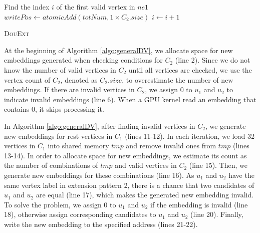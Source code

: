\begin{algorithm}
	Find the index $i$ of the first valid vertex in $ne1$\;
	$writePos \leftarrow atomicAdd(totNum,1 \times C_{2}.size)$\;
	$i \leftarrow i+1$\;
	\caption{\textsc{DouExt}}
	\label{algo:generalDV}
\end{algorithm}

At the beginning of Algorithm \ref{algo:generalDV}, we allocate space for new embeddings generated when checking conditions for $C_2$ (line 2). Since we do not know the number of valid vertices in $C_2$ until all vertices are checked, we use the vertex count of $C_2$, denoted as $C_{2}.size$, to overestimate the number of new embeddings. If there are invalid vertices in $C_2$, we assign 0 to $u_1$ and $u_2$ to indicate invalid embeddings (line 6). When a GPU kernel read an embedding that contains 0, it skips processing it.

In Algorithm \ref{algo:generalDV}, after finding invalid vertices in $C_2$, we generate new embeddings for rest vertices in $C_1$ (lines 11-12). In each iteration, we load 32 vertices in $C_1$ into shared memory $tmp$ and remove invalid ones from $tmp$ (lines 13-14). In order to allocate space for new embeddings, we estimate its count as the number of combinations of $tmp$ and valid vertices in $C_2$ (line 15). Then, we generate new embeddings for these combinations (line 16). As $u_1$ and $u_2$ have the same vertex label in extension pattern 2, there is a chance that two candidates of $u_1$ and $u_2$ are equal (line 17), which makes the generated new embedding invalid. To solve the problem, we assign 0 to $u_1$ and $u_2$ if the embedding is invalid (line 18), otherwise assign corresponding candidates to $u_1$ and $u_2$ (line 20). Finally, write the new embedding to the specified address (lines 21-22).

